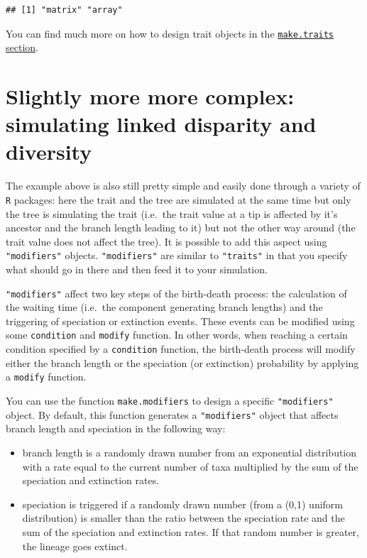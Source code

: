 \documentclass[]{book}
\providecommand{\tightlist}{%
  \setlength{\itemsep}{0pt}\setlength{\parskip}{0pt}}
\begin{document}
\begin{verbatim}
## [1] "matrix" "array"
\end{verbatim}

You can find much more on how to design trait objects in the \protect\hyperlink{maketraits}{\texttt{make.traits} section}.

\hypertarget{slightly-more-more-complex-simulating-linked-disparity-and-diversity}{%
\section{Slightly more more complex: simulating linked disparity and diversity}\label{slightly-more-more-complex-simulating-linked-disparity-and-diversity}}

The example above is also still pretty simple and easily done through a variety of \texttt{R} packages: here the trait and the tree are simulated at the same time but only the tree is simulating the trait (i.e.~the trait value at a tip is affected by it's ancestor and the branch length leading to it) but not the other way around (the trait value does not affect the tree).
It is possible to add this aspect using \texttt{"modifiers"} objects.
\texttt{"modifiers"} are similar to \texttt{"traits"} in that you specify what should go in there and then feed it to your simulation.

\texttt{"modifiers"} affect two key steps of the birth-death process: the calculation of the waiting time (i.e.~the component generating branch lengths) and the triggering of speciation or extinction events.
These events can be modified using some \texttt{condition} and \texttt{modify} function.
In other words, when reaching a certain condition specified by a \texttt{condition} function, the birth-death process will modify either the branch length or the speciation (or extinction) probability by applying a \texttt{modify} function.

You can use the function \texttt{make.modifiers} to design a specific \texttt{"modifiers"} object.
By default, this function generates a \texttt{"modifiers"} object that affects branch length and speciation in the following way:

\begin{itemize}
\tightlist
\item
  branch length is a randomly drawn number from an exponential distribution with a rate equal to the current number of taxa multiplied by the sum of the speciation and extinction rates.
\item
  speciation is triggered if a randomly drawn number (from a (0,1) uniform distribution) is smaller than the ratio between the speciation rate and the sum of the speciation and extinction rates. If that random number is greater, the lineage goes extinct.
\end{itemize}
\end{document}
